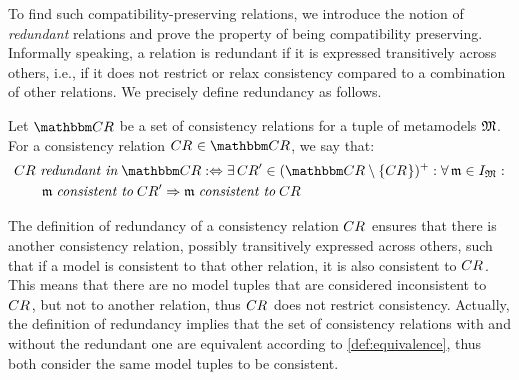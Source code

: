To find such compatibility-preserving relations, we introduce the notion of \emph{redundant} relations and prove the property of being compatibility preserving.
Informally speaking, a relation is redundant if it is expressed transitively across others, i.e., if it does not restrict or relax consistency compared to a combination of other relations.
We precisely define redundancy as follows.

\begin{definition}
\label{def:redundancy}
    Let $\consistencyrelationset{CR}$ be a set of consistency relations for a tuple of metamodels $\metamodeltuple{M}$.
    For a consistency relation $\consistencyrelation{CR}{} \in \consistencyrelationset{CR}$, we say that:
    \begin{align*}
        &
        \consistencyrelation{CR}{} \redundantinmath \consistencyrelationset{CR} \equivalentperdefinition
        \exists \consistencyrelation{CR}{}' \in \transitiveclosure{(\consistencyrelationset{CR} \setminus \setted{\consistencyrelation{CR}{}})} : 
        \forall \modeltuple{m} \in \metamodeltupleinstanceset{M} :\\
        & \formulaskip\formulaskip
        \modeltuple{m} \consistenttomath \consistencyrelation{CR}{}' \Rightarrow \modeltuple{m} \consistenttomath \consistencyrelation{CR}{}
    \end{align*}
\end{definition}

The definition of redundancy of a consistency relation $\consistencyrelation{CR}{}$ ensures that there is another consistency relation, possibly transitively expressed across others, such that if a model is consistent to that other relation, it is also consistent to $\consistencyrelation{CR}{}$.
This means that there are no model tuples that are considered inconsistent to $\consistencyrelation{CR}{}$, but not to another relation, thus $\consistencyrelation{CR}{}$ does not restrict consistency.
Actually, the definition of redundancy implies that the set of consistency relations with and without the redundant one are equivalent according to \autoref{def:equivalence}, thus both consider the same model tuples to be consistent.

